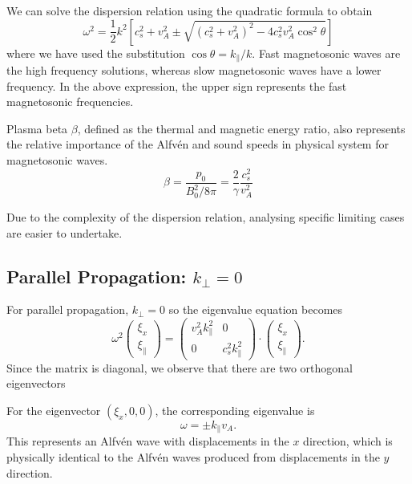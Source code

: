 We can solve the dispersion relation using the quadratic formula to obtain
\begin{equation}
    \omega^{2} = \frac{1}{2} k^{2} \left[ c_{s}^{2} + v_{A}^{2} \pm \sqrt{\left( c_{s}^{2} + v_{A}^{2} \right)^{2} - 4 c_{s}^{2} v_{A}^{2} \cos^{2}\theta} \right]
    \label{eq:Dispersion Magnetosonic}
\end{equation}
where we have used the substitution \( \cos\theta = k_{\parallel}/k.\) Fast magnetosonic waves are the high frequency solutions, whereas slow magnetosonic waves have a lower frequency. In the above expression, the upper sign represents the fast magnetosonic frequencies. 

Plasma beta \(\beta\), defined as the thermal and magnetic energy ratio, also represents the relative importance of the Alfv\'en and sound speeds in physical system for magnetosonic waves.
\begin{equation*}
    \beta = \frac{p_0}{B_0^2/8\pi}=\frac{2}{\gamma}\frac{c_s^2}{v_A^2}
\end{equation*}

Due to the complexity of the dispersion relation, analysing specific limiting cases are easier to undertake.
\subsection{Parallel Propagation: \(k_{\perp}=0\)}
For parallel propagation, \(k_{\perp}=0\) so the eigenvalue equation becomes
\begin{equation*}
    \omega^{2}
    \begin{pmatrix}
        \xi_{x} \\
        \xi_{\parallel}
    \end{pmatrix}
    =
    \begin{pmatrix}
        v_{A}^{2} k_{\parallel}^{2} & 0 \\
       0 & c_{s}^{2} k_{\parallel}^{2}
    \end{pmatrix}
    \cdot
    \begin{pmatrix}
        \xi_{x} \\
        \xi_{\parallel}
    \end{pmatrix}.
\end{equation*}
Since the matrix is diagonal, we observe that there are two orthogonal eigenvectors

For the eigenvector \((\xi_x,0,0 )\), the corresponding eigenvalue is 
\begin{equation*}
    \omega=\pm k_{\parallel}v_A.
\end{equation*}
This represents an Alfv\'en wave with displacements in the \(x\) direction, which is physically identical to the Alfv\'en waves produced from displacements in the \(y\) direction.

